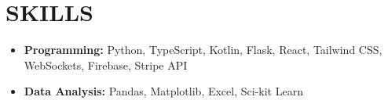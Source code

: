 \section*{SKILLS}
\noindent
\begin{itemize}
	\item \textbf{Programming:} Python, TypeScript, Kotlin, Flask, React, Tailwind CSS, WebSockets, Firebase, Stripe API
	\item \textbf{Data Analysis:} Pandas, Matplotlib, Excel, Sci-kit Learn
\end{itemize}
